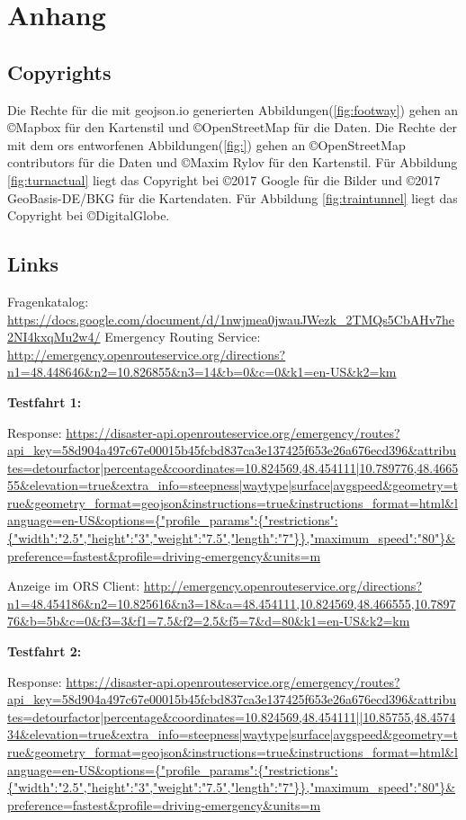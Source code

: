 \section{Anhang}
\label{sec:anhang}
\subsection*{Copyrights}
Die Rechte für die mit geojson.io generierten Abbildungen(\ref{fig:footway}) gehen an \copyright Mapbox für den Kartenstil und \copyright OpenStreetMap für die Daten.
Die Rechte der mit dem \gls{ors} entworfenen Abbildungen(\ref{fig:}) gehen an \copyright OpenStreetMap contributors für die Daten und \copyright Maxim Rylov für den Kartenstil.
Für Abbildung \ref{fig:turnactual} liegt das Copyright bei \copyright 2017 Google für die Bilder und \copyright 2017 GeoBasis-DE/BKG für die Kartendaten.
Für Abbildung \ref{fig:traintunnel} liegt das Copyright bei \copyright DigitalGlobe.

\subsection*{Links}
Fragenkatalog:
\url{https://docs.google.com/document/d/1nwjmea0jwauJWezk_2TMQs5CbAHv7he2NI4kxqMu2w4/}
\smallskip
Emergency Routing Service:
\url{http://emergency.openrouteservice.org/directions?n1=48.448646&n2=10.826855&n3=14&b=0&c=0&k1=en-US&k2=km}

\textbf{Testfahrt 1:}

Response:
\url{https://disaster-api.openrouteservice.org/emergency/routes?api_key=58d904a497c67e00015b45fcbd837ca3e137425f653e26a676ecd396&attributes=detourfactor|percentage&coordinates=10.824569,48.454111|10.789776,48.466555&elevation=true&extra_info=steepness|waytype|surface|avgspeed&geometry=true&geometry_format=geojson&instructions=true&instructions_format=html&language=en-US&options={"profile_params":{"restrictions":{"width":"2.5","height":"3","weight":"7.5","length":"7"}},"maximum_speed":"80"}&preference=fastest&profile=driving-emergency&units=m}

Anzeige im ORS Client:
\url{http://emergency.openrouteservice.org/directions?n1=48.454186&n2=10.825616&n3=18&a=48.454111,10.824569,48.466555,10.789776&b=5b&c=0&f3=3&f1=7.5&f2=2.5&f5=7&d=80&k1=en-US&k2=km}

\textbf{Testfahrt 2:}

Response:
\url{https://disaster-api.openrouteservice.org/emergency/routes?api_key=58d904a497c67e00015b45fcbd837ca3e137425f653e26a676ecd396&attributes=detourfactor|percentage&coordinates=10.824569,48.454111||10.85755,48.457434&elevation=true&extra_info=steepness|waytype|surface|avgspeed&geometry=true&geometry_format=geojson&instructions=true&instructions_format=html&language=en-US&options={"profile_params":{"restrictions":{"width":"2.5","height":"3","weight":"7.5","length":"7"}},"maximum_speed":"80"}&preference=fastest&profile=driving-emergency&units=m}

